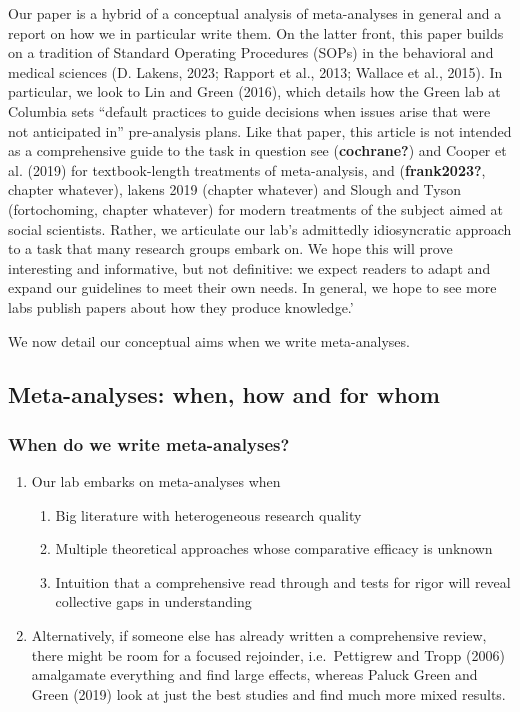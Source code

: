 \documentclass[
  man]{apa6}
\providecommand{\tightlist}{%
  \setlength{\itemsep}{0pt}\setlength{\parskip}{0pt}}
\begin{document}
Our paper is a hybrid of a conceptual analysis of meta-analyses in general and a report on how we in particular write them. On the latter front, this paper builds on a tradition of Standard Operating Procedures (SOPs) in the behavioral and medical sciences (D. Lakens, 2023; Rapport et al., 2013; Wallace et al., 2015). In particular, we look to Lin and Green (2016), which details how the Green lab at Columbia sets ``default practices to guide decisions when issues arise that were not anticipated in'' pre-analysis plans. Like that paper, this article is not intended as a comprehensive guide to the task in question \textemdash see (\textbf{cochrane?}) and Cooper et al. (2019) for textbook-length treatments of meta-analysis, and (\textbf{frank2023?}, chapter whatever), lakens 2019 (chapter whatever) and Slough and Tyson (fortochoming, chapter whatever) for modern treatments of the subject aimed at social scientists. Rather, we articulate our lab's admittedly idiosyncratic approach to a task that many research groups embark on. We hope this will prove interesting and informative, but not definitive: we expect readers to adapt and expand our guidelines to meet their own needs. In general, we hope to see more labs publish papers about how they produce knowledge.'

We now detail our conceptual aims when we write meta-analyses.

\subsection{Meta-analyses: when, how and for whom}\label{meta-analyses-when-how-and-for-whom}

\subsubsection{When do we write meta-analyses?}\label{when-do-we-write-meta-analyses}

\begin{enumerate}
\def\labelenumi{\arabic{enumi}.}
\tightlist
\item
  Our lab embarks on meta-analyses when

  \begin{enumerate}
  \def\labelenumii{\arabic{enumii}.}
  \tightlist
  \item
    Big literature with heterogeneous research quality
  \item
    Multiple theoretical approaches whose comparative efficacy is unknown
  \item
    Intuition that a comprehensive read through and tests for rigor will reveal collective gaps in understanding
  \end{enumerate}
\item
  Alternatively, if someone else has already written a comprehensive review, there might be room for a focused rejoinder, i.e.~Pettigrew and Tropp (2006) amalgamate everything and find large effects, whereas Paluck Green and Green (2019) look at just the best studies and find much more mixed results.
\end{enumerate}
\end{document}
